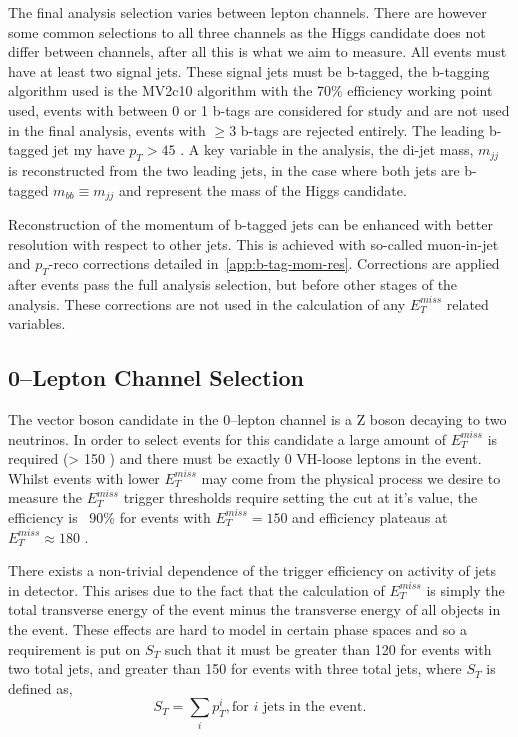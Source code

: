 The final analysis selection varies between lepton channels. There are however
some common selections to all three channels as the Higgs candidate does not
differ between channels, after all this is what we aim to measure. All events must
have at least two signal jets. These signal jets must be b-tagged, the b-tagging
algorithm used is the MV2c10 algorithm with the 70\% efficiency working point
used, events with between 0 or 1 b-tags are considered for study and are not
used in the final analysis, events with $\ge3$ b-tags are rejected entirely. The
leading b-tagged jet my have $p_T > 45$ \GeV. A key variable in the analysis, the
di-jet mass, $m_{jj}$ is reconstructed from the two leading jets, in the case
where both jets are b-tagged $m_{bb} \equiv m_{jj}$ and represent the mass of
the Higgs candidate.

Reconstruction of the momentum of b-tagged jets can be enhanced with better
resolution with respect to other jets. This is achieved with so-called
muon-in-jet and $p_T$-reco corrections detailed in~\ref{app:b-tag-mom-res}.
Corrections are applied after events pass the full analysis selection, but
before other stages of the analysis. These corrections are not used in the
calculation of any $E_T^{miss}$ related variables.

\subsection{0--Lepton Channel Selection}
\label{sec:0lep-selection}

The vector boson candidate in the 0--lepton channel is a Z boson decaying to two
neutrinos. In order to select events for this candidate a large amount of
$E_T^{miss}$ is required (> 150 \GeV) and there must be exactly 0 VH-loose
leptons in the event. Whilst events with lower $E_T^{miss}$ may come from the
physical process we desire to measure the $E_T^{miss}$ trigger thresholds
require setting the cut at it's value, the efficiency is ~90\% for events
with $E_T^{miss} = 150$ \GeV and efficiency plateaus at $E_T^{miss} \approx 180$
\GeV.

There exists a non-trivial dependence of the trigger efficiency on activity of
jets in detector. This arises due to the fact that the calculation of
$E_T^{miss}$ is simply the total transverse energy of the event minus the
transverse energy of all objects in the event. These effects are hard to model
in certain phase spaces and so a requirement is put on $S_T$ such that it must
be greater than 120 \GeV for events with two total jets, and greater than 150 \GeV
for events with three total jets, where $S_T$ is defined as,
\begin{equation}
  S_T = \sum_i p_T^i, \text{for } i \text{ jets in the event.}
\end{equation}

